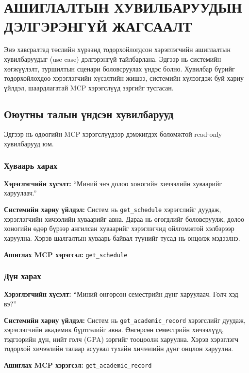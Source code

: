 \chapter{АШИГЛАЛТЫН ХУВИЛБАРУУДЫН ДЭЛГЭРЭНГҮЙ ЖАГСААЛТ}

Энэ хавсралтад төслийн хүрээнд тодорхойлогдсон хэрэглэгчийн ашиглалтын хувилбаруудыг (use case) дэлгэрэнгүй тайлбарлана. Эдгээр нь системийн хөгжүүлэлт, туршилтын сценари боловсруулах үндэс болно. Хувилбар бүрийг тодорхойлохдоо хэрэглэгчийн хүсэлтийн жишээ, системийн хүлээгдэж буй хариу үйлдэл, шаардлагатай MCP хэрэгслүүд зэргийг тусгасан.

\section{Оюутны талын үндсэн хувилбарууд}

Эдгээр нь одоогийн MCP хэрэгслүүдээр дэмжигдэх боломжтой read-only хувилбарууд юм.

\subsection{Хуваарь харах}

\textbf{Хэрэглэгчийн хүсэлт:} ``Миний энэ долоо хоногийн хичээлийн хуваарийг харуулаач.''

\textbf{Системийн хариу үйлдэл:} Систем нь \texttt{get\_schedule} хэрэгслийг дуудаж, хэрэглэгчийн хичээлийн хуваарийг авна. Дараа нь өгөгдлийг боловсруулж, долоо хоногийн өдөр бүрээр ангилсан хуваарийг хэрэглэгчид ойлгомжтой хэлбэрээр харуулна. Хэрэв шалгалтын хуваарь байвал түүнийг тусад нь онцолж мэдээлнэ.

\textbf{Ашиглах MCP хэрэгсэл:} \texttt{get\_schedule}

\subsection{Дүн харах}

\textbf{Хэрэглэгчийн хүсэлт:} ``Миний өнгөрсөн семестрийн дүнг харуулаач. Голч хэд вэ?''

\textbf{Системийн хариу үйлдэл:} Систем нь \texttt{get\_academic\_record} хэрэгслийг дуудаж, хэрэглэгчийн академик бүртгэлийг авна. Өнгөрсөн семестрийн хичээлүүд, тэдгээрийн дүн, нийт голч (GPA) зэргийг тооцоолж харуулна. Хэрэв хэрэглэгч тодорхой хичээлийн талаар асуувал тухайн хичээлийн дүнг онцлон харуулна.

\textbf{Ашиглах MCP хэрэгсэл:} \texttt{get\_academic\_record}

